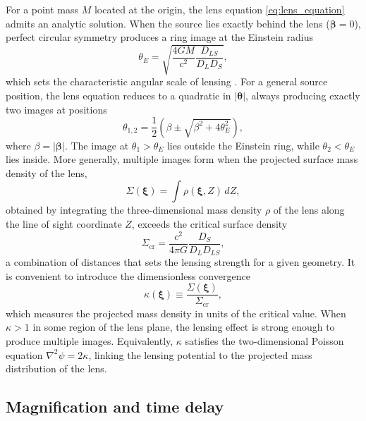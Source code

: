 For a point mass $M$ located at the origin, the lens equation \eqref{eq:lens_equation} admits an analytic solution. When the source lies exactly behind the lens ($\boldsymbol{\beta} = 0$), perfect circular symmetry produces a ring image at the Einstein radius
\begin{equation}
    \theta_E = \sqrt{\frac{4GM}{c^2}\frac{D_{LS}}{D_L D_S}},
    \label{eq:einstein_radius}
\end{equation}
which sets the characteristic angular scale of lensing \cite{essentialsstronggravitationallensing}. For a general source position, the lens equation reduces to a quadratic in $|\boldsymbol{\theta}|$, always producing exactly two images at positions
\begin{equation}
    \theta_{1,2} = \frac{1}{2}\left(\beta \pm 
    \sqrt{\beta^2 + 4\theta_E^2}\right),
    \label{eq:image_positions}
\end{equation}
where $\beta = |\boldsymbol{\beta}|$. The image at $\theta_1 > \theta_E$ lies outside the Einstein ring, while $\theta_2 < \theta_E$ lies inside. More generally, multiple images form when the projected surface mass density of the lens,
\begin{equation}
    \Sigma(\boldsymbol{\xi}) = 
    \int \rho(\boldsymbol{\xi}, Z)\,dZ,
\end{equation}
obtained by integrating the three-dimensional mass density 
$\rho$ of the lens along the line of sight coordinate $Z$, 
exceeds the critical surface density
\begin{equation}
    \Sigma_\mathrm{cr} = \frac{c^2}{4\pi G}
    \frac{D_S}{D_L D_{LS}},
    \label{eq:critical_density}
\end{equation}
a combination of distances that sets the lensing strength for a given geometry. It is convenient to introduce the dimensionless convergence
\begin{equation}
    \kappa(\boldsymbol{\xi}) \equiv 
    \frac{\Sigma(\boldsymbol{\xi})}{\Sigma_\mathrm{cr}},
\end{equation}
which measures the projected mass density in units of the critical value. When $\kappa > 1$ in some region of the lens plane, the lensing effect is strong enough to produce multiple images. Equivalently, $\kappa$ satisfies the two-dimensional Poisson equation $\nabla^2\psi = 2\kappa$, linking the lensing potential to the projected mass distribution of the lens.



\subsection{Magnification and time delay}
\label{sec:timedelay}

